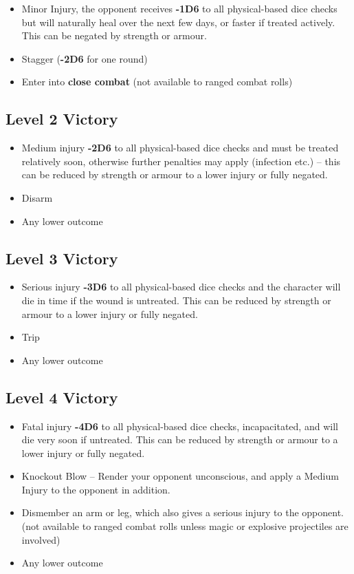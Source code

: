 \begin{itemize}
    \item Minor Injury, the opponent receives \textbf{-1D6} to all physical-based dice checks but will naturally heal over the next few days, or faster if treated actively. This can be negated by strength or armour.
    \item Stagger (\textbf{-2D6} for one round)
    \item Enter into \textbf{close combat} (not available to ranged combat rolls)
\end{itemize}

\subsection{Level 2 Victory} \label{subsec:level_2_victory}

\begin{itemize}
    \item Medium injury \textbf{-2D6} to all physical-based dice checks and must be treated relatively soon, otherwise further penalties may apply (infection etc.) – this can be reduced by strength or armour to a lower injury or fully negated.
    \item Disarm
    \item Any lower outcome
\end{itemize}

\subsection{Level 3 Victory} \label{subsec:level_3_victory}

\begin{itemize}
    \item Serious injury \textbf{-3D6} to all physical-based dice checks and the character will die in time if the wound is untreated. This can be reduced by strength or armour to a lower injury or fully negated.
    \item Trip
    \item Any lower outcome
\end{itemize}

\subsection{Level 4 Victory} \label{subsec:level_4_victory}

\begin{itemize}
    \item Fatal injury \textbf{-4D6} to all physical-based dice checks, incapacitated, and will die very soon if untreated. This can be reduced by strength or armour to a lower injury or fully negated.
    \item Knockout Blow – Render your opponent unconscious, and apply a Medium Injury to the opponent in addition.
    \item Dismember an arm or leg, which also gives a serious injury to the opponent. (not available to ranged combat rolls unless magic or explosive projectiles are involved)
    \item Any lower outcome
\end{itemize}

